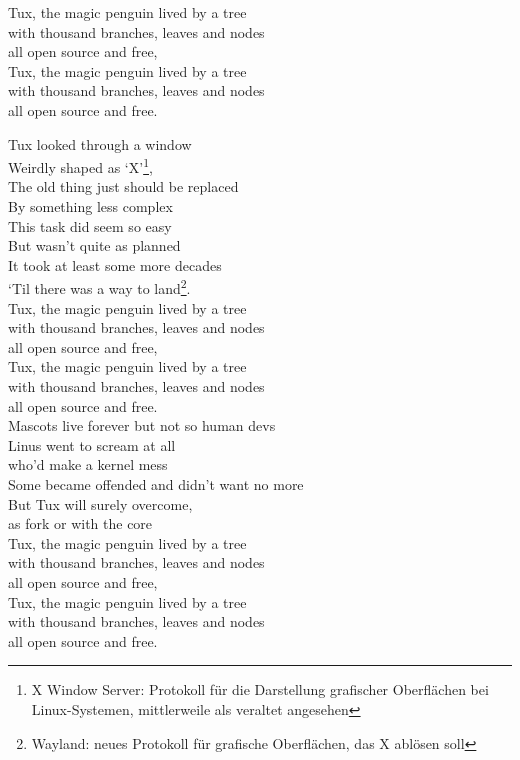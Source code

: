 \documentclass[11pt,a5paper]{article}
\begin{document}
			Tux, the magic penguin lived by a tree \\
			with thousand branches, leaves and nodes \\
			all open source and free, \\
			Tux, the magic penguin lived by a tree \\
			with thousand branches, leaves and nodes \\
			all open source and free. \pagebreak
			
			Tux looked through a window \\
			Weirdly shaped as ‘X’\footnote{\scriptsize X Window Server: Protokoll für die Darstellung grafischer Oberflächen bei Linux-Systemen, mittlerweile als veraltet angesehen}, \\
			The old thing just should be replaced \\ 
			By something less complex \\
			This task did seem so easy \\
			But wasn’t quite as planned \\
			It took at least some more decades \\
			‘Til there was a way to land\footnote{\scriptsize Wayland: neues Protokoll für grafische Oberflächen, das X ablösen soll}. \\
			
			Tux, the magic penguin lived by a tree \\
			with thousand branches, leaves and nodes \\
			all open source and free, \\
			Tux, the magic penguin lived by a tree \\
			with thousand branches, leaves and nodes \\
			all open source and free. \\
			
			Mascots live forever but not so human devs \\
			Linus went to scream at all \\
			who’d make a kernel mess \\
			Some became offended and didn’t want no more \\
			But Tux will surely overcome,  \\
			as fork or with the core \\
			
			Tux, the magic penguin lived by a tree \\
			with thousand branches, leaves and nodes \\
			all open source and free, \\
			Tux, the magic penguin lived by a tree \\ 
			with thousand branches, leaves and nodes \\
			all open source and free. \\
			\pagebreak
\end{document}
